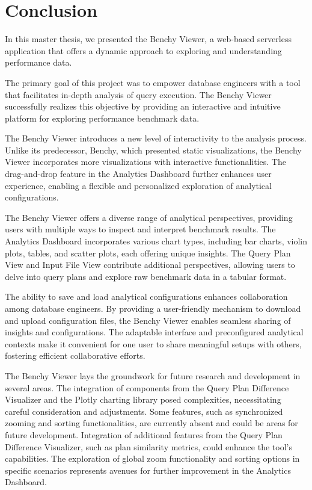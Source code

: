 
\chapter{Conclusion}\label{chapter:conclusion}

In this master thesis, we presented the Benchy Viewer, a web-based serverless application that offers a dynamic approach to exploring and understanding performance data. 

The primary goal of this project was to empower database engineers with a tool that facilitates in-depth analysis of query execution. The Benchy Viewer successfully realizes this objective by providing an interactive and intuitive platform for exploring performance benchmark data.

The Benchy Viewer introduces a new level of interactivity to the analysis process. Unlike its predecessor, Benchy, which presented static visualizations, the Benchy Viewer incorporates more visualizations with interactive functionalities. The drag-and-drop feature in the Analytics Dashboard further enhances user experience, enabling a flexible and personalized exploration of analytical configurations.

The Benchy Viewer offers a diverse range of analytical perspectives, providing users with multiple ways to inspect and interpret benchmark results. The Analytics Dashboard incorporates various chart types, including bar charts, violin plots, tables, and scatter plots, each offering unique insights. The Query Plan View and Input File View contribute additional perspectives, allowing users to delve into query plans and explore raw benchmark data in a tabular format.

The ability to save and load analytical configurations enhances collaboration among database engineers. By providing a user-friendly mechanism to download and upload configuration files, the Benchy Viewer enables seamless sharing of insights and configurations. The adaptable interface and preconfigured analytical contexts make it convenient for one user to share meaningful setups with others, fostering efficient collaborative efforts.

The Benchy Viewer lays the groundwork for future research and development in several areas. The integration of components from the Query Plan Difference Visualizer and the Plotly charting library posed complexities, necessitating careful consideration and adjustments. Some features, such as synchronized zooming and sorting functionalities, are currently absent and could be areas for future development. Integration of additional features from the Query Plan Difference Visualizer, such as plan similarity metrics, could enhance the tool's capabilities. The exploration of global zoom functionality and sorting options in specific scenarios represents avenues for further improvement in the Analytics Dashboard.

